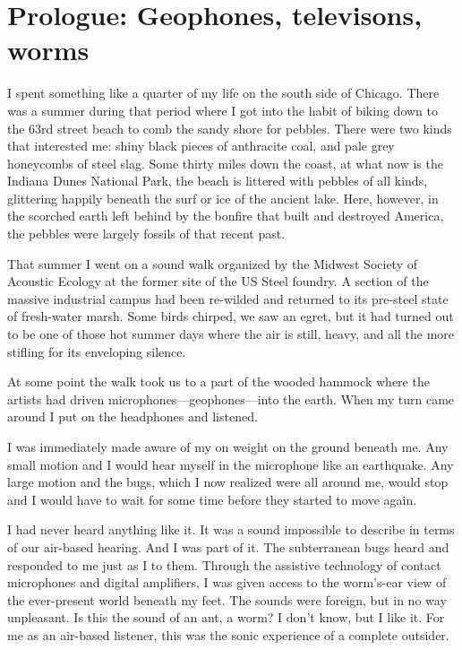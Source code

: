 \documentclass[12pt,letterpaper]{article}
\begin{document}
	\newpage
	\section*{Prologue: Geophones, televisons, worms}

	I spent something like a quarter of my life on the south side of 
	Chicago. There was a summer during that period where I got into the 
	habit of biking down to the 63rd street beach to comb the sandy shore 
	for pebbles. There were two kinds that interested me: shiny black 
	pieces of anthracite coal, and pale grey honeycombs of steel slag. Some
	thirty miles down the coast, at what now is the Indiana Dunes National 
	Park, the beach is littered with pebbles of all kinds, glittering 
	happily beneath the surf or ice of the ancient lake. Here, however, in 
	the scorched earth left behind by the bonfire that built and destroyed 
	America, the pebbles were largely fossils of that recent past.

	That summer I went on a sound walk organized by the Midwest Society of
	Acoustic Ecology at the former site of the US Steel foundry. A section 
	of the massive industrial campus had been re-wilded and returned to its
	pre-steel state of fresh-water marsh. Some birds chirped, we saw an 
	egret, but it had turned out to be one of those hot summer days where 
	the air is still, heavy, and all the more stifling for its enveloping 
	silence. 

	At some point the walk took us to a part of the wooded hammock where 
	the artists had driven microphones---geophones---into the earth. When 
	my turn came around I put on the headphones and listened. 

	I was immediately made aware of my on weight on the ground beneath me. 
	Any small motion and I would hear myself in the microphone like an 
	earthquake. Any large motion and the bugs, which I now realized were all
	around me, would stop and I would have to wait for some time before they
	started to move again. 

	I had never heard anything like it. It was a sound impossible to 
	describe in terms of our air-based hearing. And I was part of it. The 
	subterranean bugs heard and responded to me just as I to them. Through 
	the assistive technology of contact microphones and digital amplifiers, 
	I was given access to the worm's-ear view of the ever-present world 
	beneath my feet. The sounds were foreign, but in no way unpleasant. Is 
	this the sound of an ant, a worm? I don't know, but I like it. For me as
	an air-based listener, this was the sonic experience of a complete 
	outsider.	
	
\end{document}
